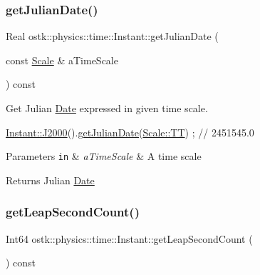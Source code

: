 \subsubsection{\texorpdfstring{get\+Julian\+Date()}{getJulianDate()}}
{\footnotesize\ttfamily Real ostk\+::physics\+::time\+::\+Instant\+::get\+Julian\+Date (\begin{DoxyParamCaption}\item[{const \hyperlink{namespaceostk_1_1physics_1_1time_adf23d37bd8641fb76a0e98ab46a70df7}{Scale} \&}]{a\+Time\+Scale }\end{DoxyParamCaption}) const}



Get Julian \hyperlink{classostk_1_1physics_1_1time_1_1_date}{Date} expressed in given time scale. 


\begin{DoxyCode}
\hyperlink{classostk_1_1physics_1_1time_1_1_instant_a3f84d0c2d0b140326d3b172b54e3ffff}{Instant::J2000}().\hyperlink{classostk_1_1physics_1_1time_1_1_instant_a71b3a5992123fddb3a3539dc99df66c1}{getJulianDate}(\hyperlink{namespaceostk_1_1physics_1_1time_adf23d37bd8641fb76a0e98ab46a70df7adf1f3edb9115acb0a1e04209b7a9937b}{Scale::TT}) ; \textcolor{comment}{// 2451545.0}
\end{DoxyCode}



\begin{DoxyParams}[1]{Parameters}
\mbox{\tt in}  & {\em a\+Time\+Scale} & A time scale \\
\hline
\end{DoxyParams}
\begin{DoxyReturn}{Returns}
Julian \hyperlink{classostk_1_1physics_1_1time_1_1_date}{Date} 
\end{DoxyReturn}
\mbox{\label{classostk_1_1physics_1_1time_1_1_instant_aceab87ef79e6f5d1438ac78e11bdcd6f}} 
\subsubsection{\texorpdfstring{get\+Leap\+Second\+Count()}{getLeapSecondCount()}}
{\footnotesize\ttfamily Int64 ostk\+::physics\+::time\+::\+Instant\+::get\+Leap\+Second\+Count (\begin{DoxyParamCaption}{ }\end{DoxyParamCaption}) const}



